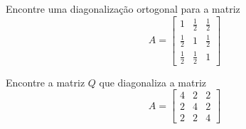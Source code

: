 \begin{frame}[label=orto]{}


\begin{exe}
Encontre  uma diagonalização ortogonal para a matriz
\[
A=
\begin{bmatrix}
1 & \frac{1}{2} & \frac{1}{2}\\[0.5em] 
\frac{1}{2} & 1 & \frac{1}{2}\\[0.5em]
 \frac{1}{2} & \frac{1}{2} & 1
\end{bmatrix}
\]
\end{exe}

\begin{casa}
Encontre a matriz \(Q\) que diagonaliza a matriz
\[
A=\begin{bmatrix}
4 & 2 & 2 \\
2 & 4 & 2 \\
2 & 2 & 4
\end{bmatrix}
\]
\end{casa}
\end{frame}
